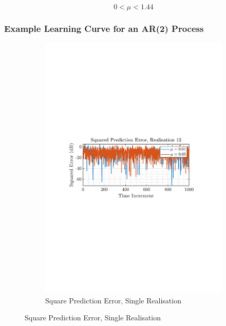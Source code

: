 \documentclass[12pt]{article}
\begin{document}
			\begin{equation}
			0 < \mu < 1.44
			\label{eq: 2-1a-cond:mu_max_val}
			\end{equation}
		\subsubsection{Example Learning Curve for an AR(2) Process}
		
			\begin{figure}[H]
				\centering
				\begin{subfigure}{0.49\textwidth}
					\centering
					\includegraphics[trim={2.2cm 11.2cm 3.15cm  11.2cm}, clip, width=\textwidth]{../MATLAB/figures/q2_1b_fig01.pdf} 
					\captionsetup{justification=centering}
					\caption{Square Prediction Error, Single Realisation}
				\end{subfigure}

\end{figure}
\end{document}
